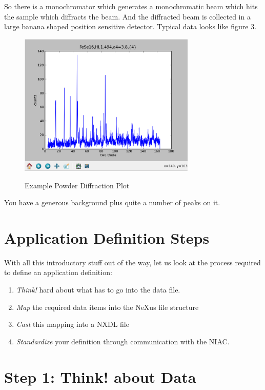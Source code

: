 \documentclass[a4paper]{article}\usepackage[dvips]{graphicx}
\begin{document}
So there is a monochromator which generates a monochromatic beam which hits the 
sample which diffracts the beam. And the diffracted beam is collected in a large banana shaped position sensitive detector. 
Typical data looks like figure 3. 
\begin{figure}[!ht]
\includegraphics[width=0.75\textwidth]{powderimage.eps}
\label{fig3}
\caption{Example Powder Diffraction Plot}
\end{figure}


You have a generous background plus quite a number of peaks on it.




\section{Application Definition Steps }

With all this introductory stuff out of the way, let us look at the process required to define an application definition:


\begin{enumerate}\item {\em  Think!} hard about what has to go into the data file.
\item {\em  Map} the required data items into the NeXus file structure
\item {\em  Cast} this mapping into a NXDL file
\item {\em  Standardize} your definition through communication with the NIAC. 
\end{enumerate}

\section{Step 1: Think! about Data }
\end{document}
